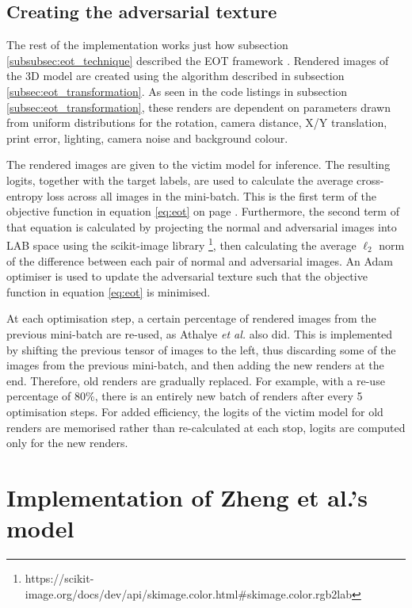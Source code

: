 \subsection{Creating the adversarial texture}

The rest of the implementation works just how subsection \ref{subsubsec:eot_technique} described the EOT framework \cite{athalye}. Rendered images of the 3D model are created using the algorithm described in subsection \ref{subsec:eot_transformation}. As seen in the code listings in subsection \ref{subsec:eot_transformation}, these renders are dependent on parameters drawn from uniform distributions for the rotation, camera distance, X/Y translation, print error, lighting, camera noise and background colour.

The rendered images are given to the victim model for inference. The resulting logits, together with the target labels, are used to calculate the average cross-entropy loss across all images in the mini-batch. This is the first term of the objective function in equation \ref{eq:eot} on page \pageref{eq:eot}. Furthermore, the second term of that equation is calculated by projecting the normal and adversarial images into LAB space \cite{lab} using the scikit-image library \footnote{https://scikit-image.org/docs/dev/api/skimage.color.html\#skimage.color.rgb2lab}, then calculating the average $\ell_2$ norm of the difference between each pair of normal and adversarial images. An Adam optimiser is used to update the adversarial texture such that the objective function in equation \ref{eq:eot} is minimised.

At each optimisation step, a certain percentage of rendered images from the previous mini-batch are re-used, as Athalye \textit{et al.} also did. This is implemented by shifting the previous tensor of images to the left, thus discarding some of the images from the previous mini-batch, and then adding the new renders at the end. Therefore, old renders are gradually replaced. For example, with a re-use percentage of 80\%, there is an entirely new batch of renders after every 5 optimisation steps. For added efficiency, the logits of the victim model for old renders are memorised rather than re-calculated at each stop, logits are computed only for the new renders.

\section{Implementation of Zheng et al.'s model}
    \label{sec:zheng_implementation}
    
